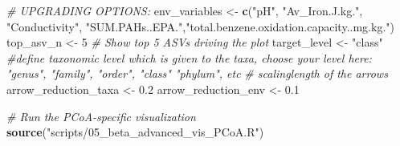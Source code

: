 \documentclass[
]{article}
\newenvironment{Shaded}{\begin{snugshade}}{\end{snugshade}}
\newcommand{\CommentTok}[1]{\textcolor[rgb]{0.56,0.35,0.01}{\textit{#1}}}
\newcommand{\DecValTok}[1]{\textcolor[rgb]{0.00,0.00,0.81}{#1}}
\newcommand{\FloatTok}[1]{\textcolor[rgb]{0.00,0.00,0.81}{#1}}
\newcommand{\FunctionTok}[1]{\textcolor[rgb]{0.13,0.29,0.53}{\textbf{#1}}}
\newcommand{\NormalTok}[1]{#1}
\newcommand{\OtherTok}[1]{\textcolor[rgb]{0.56,0.35,0.01}{#1}}
\newcommand{\StringTok}[1]{\textcolor[rgb]{0.31,0.60,0.02}{#1}}
\begin{document}
\begin{Shaded}
\begin{Highlighting}[]
\CommentTok{\# UPGRADING OPTIONS:}
\NormalTok{env\_variables    }\OtherTok{\textless{}{-}} \FunctionTok{c}\NormalTok{(}\StringTok{"pH"}\NormalTok{, }\StringTok{"Av\_Iron.J.kg."}\NormalTok{, }\StringTok{"Conductivity"}\NormalTok{, }\StringTok{"SUM.PAHs..EPA."}\NormalTok{,}\StringTok{"total.benzene.oxidation.capacity..mg.kg."}\NormalTok{)}
\NormalTok{top\_asv\_n        }\OtherTok{\textless{}{-}} \DecValTok{5}    \CommentTok{\# Show top 5 ASVs driving the plot}
\NormalTok{target\_level }\OtherTok{\textless{}{-}} \StringTok{"class"} \CommentTok{\#define taxonomic level which is given to the taxa, choose your level here: "genus", "family", "order", "class" "phylum", etc}
\CommentTok{\# scalinglength of the arrows}
\NormalTok{arrow\_reduction\_taxa }\OtherTok{\textless{}{-}} \FloatTok{0.2}
\NormalTok{arrow\_reduction\_env }\OtherTok{\textless{}{-}} \FloatTok{0.1}

\CommentTok{\# Run the PCoA{-}specific visualization}
\FunctionTok{source}\NormalTok{(}\StringTok{"scripts/05\_beta\_advanced\_vis\_PCoA.R"}\NormalTok{)}
\end{Highlighting}
\end{Shaded}
\end{document}
